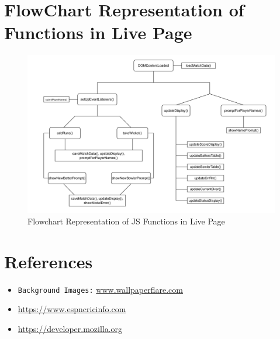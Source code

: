\documentclass[a4paper,12pt]{article}
\begin{document}
\section{FlowChart Representation of Functions in Live Page}
\begin{figure}[h!]
\centering
\includegraphics[width=\textwidth]{images/flowchart.png}
\caption{Flowchart Representation of JS Functions in Live Page} 
\label{flowchart}
\end{figure}

\section{References}
\begin{itemize}
  \item \texttt{Background Images:} \url{www.wallpaperflare.com}
  \item \url{https://www.espncricinfo.com}
  \item \url{https://developer.mozilla.org}
\end{itemize}
\end{document}
